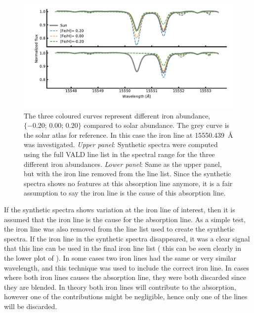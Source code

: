 \begin{figure}[htpb!]
    \centering
    \includegraphics[width=1.0\linewidth]{figures/synthetic_investigation.pdf}
    \caption{The three coloured curves represent different iron abundance, $\{-0.20;\,0.00;\,0.20\}$
             compared to solar abundance. The grey curve is the solar atlas for reference. In this
             case the iron line at \SI{15550.439}{\angstrom} was investigated.
             \emph{Upper panel}:
             Synthetic spectra were computed using the full VALD line list in the spectral range for
             the three different iron abundances.
             \emph{Lower panel}:
             Same as the upper panel, but with the iron line removed from the line list. Since the
             synthetic spectra shows no features at this absorption line anymore, it is a fair
             assumption to say the iron line is the cause of this absorption line.}
    \label{fig:synthetic_investigation}
\end{figure}

If the synthetic spectra shows variation at the iron line of interest, then it is assumed that the
iron line is the cause for the absorption line. As a simple test, the iron line was also removed
from the line list used to create the synthetic spectra. If the iron line in the synthetic spectra
disappeared, it was a clear signal that this line can be used in the final iron line list ( this can
be seen clearly in the lower plot of ). In some cases two iron
lines had the same or very similar wavelength, and this technique was used to include the correct
iron line. In cases where both iron lines causes the absorption line, they were both discarded since
they are blended. In theory both iron lines will contribute to the absorption, however one of the
contributions might be negligible, hence only one of the lines will be discarded.

